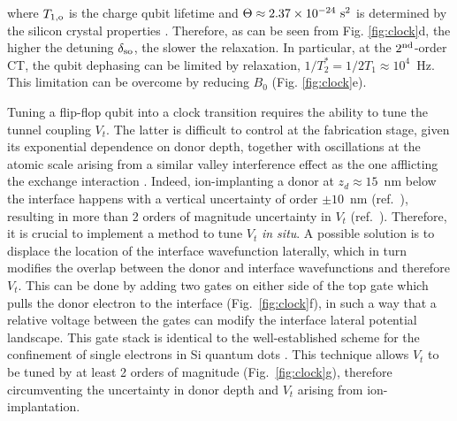 \documentclass[aps,prb,superscriptaddress,nobibnotes,preprint]{revtex4-1}%
\begin{document}
where $T_{1,\rm o}$ is the charge qubit lifetime and $\Theta\approx2.37\times10^{-24}~{\rm s}^2$ is determined by the silicon crystal properties \cite{Boross2016}. Therefore, as can be seen from Fig. \ref{fig:clock}d, the higher the detuning $\delta_{\rm so}$, the slower the relaxation. In particular, at the $2^{\rm nd}$-order CT, the qubit dephasing can be limited by relaxation, $1/T_2^*=1/2T_1\approx10^4$~Hz. This limitation can be overcome by reducing $B_0$ (Fig. \ref{fig:clock}e).

Tuning a flip-flop qubit into a clock transition requires the ability to tune the tunnel coupling $V_t$. The latter is difficult to control at the fabrication stage, given its exponential dependence on donor depth, together with oscillations at the atomic scale \cite{Calderon2008} arising from a similar valley interference effect as the one afflicting the exchange interaction \cite{Koiller2002}. Indeed, ion-implanting a donor at $z_d \approx 15$~nm below the interface happens with a vertical uncertainty of order $\pm 10$~nm (ref.~), resulting in more than 2 orders of magnitude uncertainty in $V_t$ (ref.~). Therefore, it is crucial to implement a method to tune $V_t$ \emph{in situ}. A possible solution is to displace the location of the interface wavefunction laterally, which in turn modifies the overlap between the donor and interface wavefunctions and therefore $V_t$. This can be done by adding two gates on either side of the top gate which pulls the donor electron to the interface (Fig.~\ref{fig:clock}f), in such a way that a relative voltage between the gates can modify the interface lateral potential landscape. This gate stack is identical to the well-established scheme for the confinement of single electrons in Si quantum dots \cite{Veldhorst2014}. This technique allows $V_t$ to be tuned by at least 2 orders of magnitude (Fig.~\ref{fig:clock}g), therefore circumventing the uncertainty in donor depth and $V_t$ arising from ion-implantation.
\end{document}
